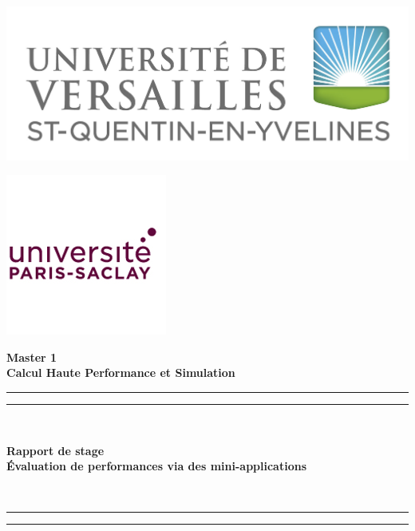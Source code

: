 \documentclass[11pt,a4paper,oneside]{memoir}
\theoremstyle{definition}
\theoremstyle{remark}
\theoremstyle{plain}
\begin{document}


\thispagestyle{empty}

\begin{minipage}{.47\textwidth}
\centering
\begin{flushleft}
\includegraphics[scale=0.25]{./Images-Rapport/logo_uvsq.jpeg}
\end{flushleft}
\end{minipage}
\begin{minipage}{.47\textwidth}
\centering
\begin{flushright}
\hspace*{1cm} \includegraphics[scale=0.9]{./Images-Rapport/logo_saclay.jpeg}
\end{flushright}
\end{minipage}


\begin{center}
\huge
\textbf{Master 1\\ Calcul Haute Performance et Simulation}
\end{center}


\begin{center}
  \hrule
  \hrule
  ~\\
  \begin{center}
    \huge
    \textbf{Rapport de stage}\\
    \bigskip
    \textbf{\'Evaluation de performances via des mini-applications}\\
  \end{center}
  ~\\
  \hrule
  \hrule
\end{center}
\end{document}

